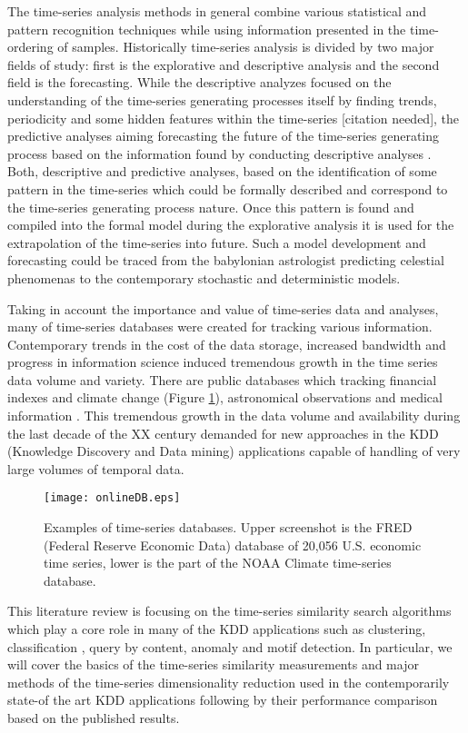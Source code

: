 The time-series analysis methods in general combine various statistical and pattern recognition techniques while using information presented in the time-ordering of samples. Historically time-series analysis is divided by two major fields of study: first is the explorative and descriptive analysis and the second field is the forecasting. 
While the descriptive analyzes focused on the understanding of the time-series generating processes itself by finding trends, periodicity and some hidden features within the time-series [citation needed], the predictive analyses aiming forecasting the future of the time-series generating process based on the information found by conducting descriptive analyses \cite{citeulike:3449765}. 
Both, descriptive and predictive analyses, based on the identification of some pattern in the time-series which could be formally described and correspond to the time-series generating process nature. Once this pattern is found and compiled into the formal model during the explorative analysis it is used for the extrapolation of the time-series into future. Such a model development and forecasting could be traced from the babylonian astrologist predicting celestial phenomenas to the contemporary stochastic and deterministic models.

Taking in account the importance and value of time-series data and analyses, many of time-series databases were created for tracking various information. Contemporary trends in the cost of the data storage, increased bandwidth and progress in information science induced tremendous growth in the time series data volume and variety. There are public databases which tracking financial indexes and climate change (Figure \ref{fig:onlineDB}), astronomical observations \cite{citeulike:4373331} and medical information \cite{citeulike:4373332}. This tremendous growth in the data volume and availability during the last decade of the XX century demanded for new approaches in the KDD (Knowledge Discovery and Data mining) applications capable of handling of very large volumes of temporal data.
\begin{figure}[tbp]
   \centering
   \texttt{[image: onlineDB.eps]}
   \caption{Examples of time-series databases. Upper screenshot is the FRED (Federal Reserve Economic Data) database of 20,056 U.S. economic time series, lower is the part of the NOAA Climate time-series database.}
   \label{fig:onlineDB}
\end{figure} 
This literature review is focusing on the time-series similarity search algorithms which play a core role in many of the KDD applications such as clustering, classification , query by content, anomaly and motif detection. In particular, we will cover the basics of the time-series similarity measurements and major methods of the time-series dimensionality reduction used in the contemporarily state-of the art KDD applications following by their performance comparison based on the published results.